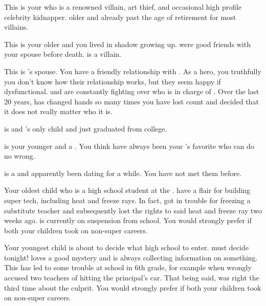 \documentclass[char]{LRSguildcamp1}
\begin{document}
\begin{contacts}
	\contact{\cGrandma{}} This is your \cGrandma{\parent} who is a renowned villain, art thief, and occasional high profile celebrity kidnapper. \cGrandma{\Theyare} older and already past the age of retirement for most villains.
	
	\contact{\cOldest{}} This is your older \cOldest{\sibling} and you lived in \cOldest{\their} shadow growing up. \cOldest{\They} were good friends with your spouse before \cAS{\their} death. \cOldest{} is a villain. 
	
	\contact{\cOS{}} This is \cOldest{}'s spouse. You have a friendly relationship with \cOS{\them}. As a hero, you truthfully you don't know how their relationship works, but they seem happy if dysfunctional.  \cOldest{} and \cOS{} are constantly fighting over who is in charge of \pCityO{}.  Over the last 20 years, \pCityO{} has changed hands so many times you have lost count and decided that it does not really matter who it is. 
	
	\contact{\cGrad{}} \cGrad{} is \cOldest{} and \cOS{}'s only child and just graduated from college. 
	
	\contact{\cYoungest{}} \cYoungest{} is your younger \cYoungest{\sibling} and a \cYoungest{\hero}. You think  have always been your \cGrandma{\parent}'s favorite who can do no wrong. 
	
	\contact{\cYS{}} \cYS{} is a \cYS{\hero} and apparently been dating \cYoungest{} for a while. You have not met them before. 
	
	\contact{\cTeen{}} Your oldest child who is a high school student at the \pNormalSchool{}. \cTeen{\They} have a flair for building super tech, including heat and freeze rays. In fact, \cTeen{} got in trouble for freezing a substitute teacher and subsequently lost the rights to said heat and freeze ray two weeks ago. \cTeen{} is currently on suspension from school. You would strongly prefer if both your children took on non-super careers.
	
	\contact{\cTween{}} Your youngest child is about to decide what high school to enter. \cTween{} must decide tonight! \cTween{} loves a good mystery and is always collecting information on something. This has led to some trouble at school in 6th grade, for example when \cTween{\they} wrongly accused two teachers of hitting the principal's car. That being said, \cTween{\they} was right the third time about the culprit. You would strongly prefer if both your children took on non-super careers.
\end{contacts}
\end{document}
